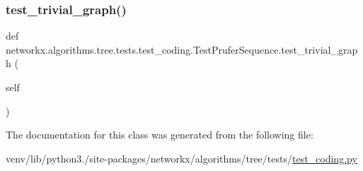 \subsubsection{\texorpdfstring{test\+\_\+trivial\+\_\+graph()}{test\_trivial\_graph()}}
{\footnotesize\ttfamily def networkx.\+algorithms.\+tree.\+tests.\+test\+\_\+coding.\+Test\+Prufer\+Sequence.\+test\+\_\+trivial\+\_\+graph (\begin{DoxyParamCaption}\item[{}]{self }\end{DoxyParamCaption})}



The documentation for this class was generated from the following file\+:\begin{DoxyCompactItemize}
\item 
venv/lib/python3./site-\/packages/networkx/algorithms/tree/tests/\hyperlink{test__coding_8py}{test\+\_\+coding.\+py}\end{DoxyCompactItemize}
